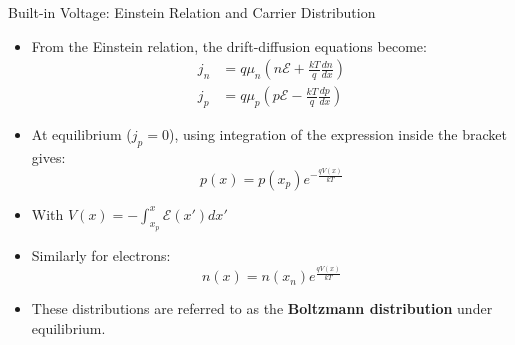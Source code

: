 \begin{frame}{Built-in Voltage: Einstein Relation and Carrier Distribution}
    \begin{itemize}
        \item From the Einstein relation, the drift-diffusion equations become:
        \begin{align}
            j_n &= q \mu_n \left( n \mathcal{E} + \frac{kT}{q} \frac{dn}{dx} \right)  \\
            j_p &= q \mu_p \left( p \mathcal{E} - \frac{kT}{q} \frac{dp}{dx} \right) 
        \end{align}
        \item At equilibrium ($j_p = 0$), using integration of the expression inside the bracket gives:
        \begin{equation}
            p(x) = p(x_p) e^{-\frac{qV(x)}{kT}}
        \end{equation}
        \item With $V(x) = - \int_{x_p}^{x} \mathcal{E}(x') dx'$
        \item Similarly for electrons:
        \begin{equation}
            n(x) = n(x_n) e^{\frac{qV(x)}{kT}} 
        \end{equation}
        \item These distributions are referred to as the \textbf{Boltzmann distribution} under equilibrium.
    \end{itemize}
\end{frame}

